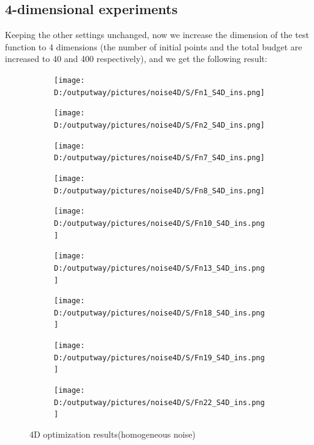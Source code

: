 \documentclass{article}
\begin{document}
\subsection{4-dimensional experiments}
Keeping the other settings unchanged, now we increase the dimension of the test function to 4 dimensions (the number of initial points and the total budget are increased to 40 and 400 respectively), and we get the following result:

 \begin{figure}[ht]
    \centering
    \begin{subfigure}[t]{.32\linewidth}
        \centering
        \texttt{[image: D:/outputway/pictures/noise4D/S/Fn1\_S4D\_ins.png]}
    \end{subfigure}
    \begin{subfigure}[t]{.32\linewidth}
        \centering
        \texttt{[image: D:/outputway/pictures/noise4D/S/Fn2\_S4D\_ins.png]}
    \end{subfigure}
    \begin{subfigure}[t]{.32\linewidth}
        \centering
        \texttt{[image: D:/outputway/pictures/noise4D/S/Fn7\_S4D\_ins.png]}
    \end{subfigure}
    \begin{subfigure}[t]{.32\linewidth}
        \centering
        \texttt{[image: D:/outputway/pictures/noise4D/S/Fn8\_S4D\_ins.png]}
    \end{subfigure}
    \begin{subfigure}[t]{.32\linewidth}
        \centering
        \texttt{[image: D:/outputway/pictures/noise4D/S/Fn10\_S4D\_ins.png]}
    \end{subfigure}
    \begin{subfigure}[t]{.32\linewidth}
        \centering
        \texttt{[image: D:/outputway/pictures/noise4D/S/Fn13\_S4D\_ins.png]}
    \end{subfigure}
    \begin{subfigure}[t]{.32\linewidth}
        \centering
        \texttt{[image: D:/outputway/pictures/noise4D/S/Fn18\_S4D\_ins.png]}
    \end{subfigure}
    \begin{subfigure}[t]{.32\linewidth}
        \centering
        \texttt{[image: D:/outputway/pictures/noise4D/S/Fn19\_S4D\_ins.png]}
    \end{subfigure}
    \begin{subfigure}[t]{.32\linewidth}
        \centering
        \texttt{[image: D:/outputway/pictures/noise4D/S/Fn22\_S4D\_ins.png]}
    \end{subfigure}
    \caption{4D optimization results(homogeneous noise)}
    \label{Fig6}
\end{figure}
\end{document}
